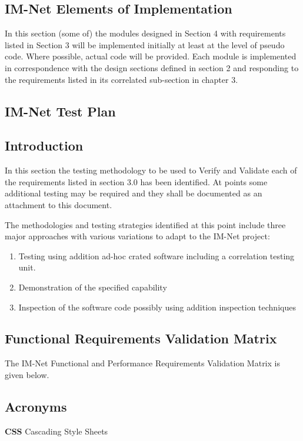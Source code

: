 \documentclass[letterpaper,12pt]{article}
\newcommand{\Section}[1]{\section{#1} \setcounter{figure}{0}}
\begin{document}
{\eject

 
\textcolor{section}{\Section{IM-Net Elements of Implementation}}

In this section (some of) the modules designed in Section 4 with requirements listed in Section 3 will be implemented initially at least at the level of pseudo code. Where possible, actual code will be provided. Each module is implemented in correspondence with the design sections defined in section 2 and responding to the requirements listed in its correlated sub-section in chapter 3.

\eject 

\textcolor{section}{\Section{IM-Net Test Plan}}

\textcolor{subsection}{\subsection{Introduction}}

In this section the testing methodology to be used to Verify and Validate each of the requirements listed in section 3.0 has been identified. At points some additional testing may be required and they shall be documented as an attachment to this document. 

The methodologies and testing strategies identified at this point include three major approaches with various variations to adapt to the IM-Net project:

\begin{enumerate}
\item  Testing using addition ad-hoc crated software including a correlation testing unit.

\item  Demonstration of the specified capability

\item  Inspection of the software code possibly using addition inspection techniques
\end{enumerate}

 
\textcolor{subsection}{\subsection{Functional Requirements Validation Matrix}}
The IM-Net Functional and Performance Requirements Validation Matrix is given below.
\eject 

\appendix

\textcolor{section}{\Section{Acronyms}}

\textbf{CSS} Cascading Style Sheets

}
\end{document}
